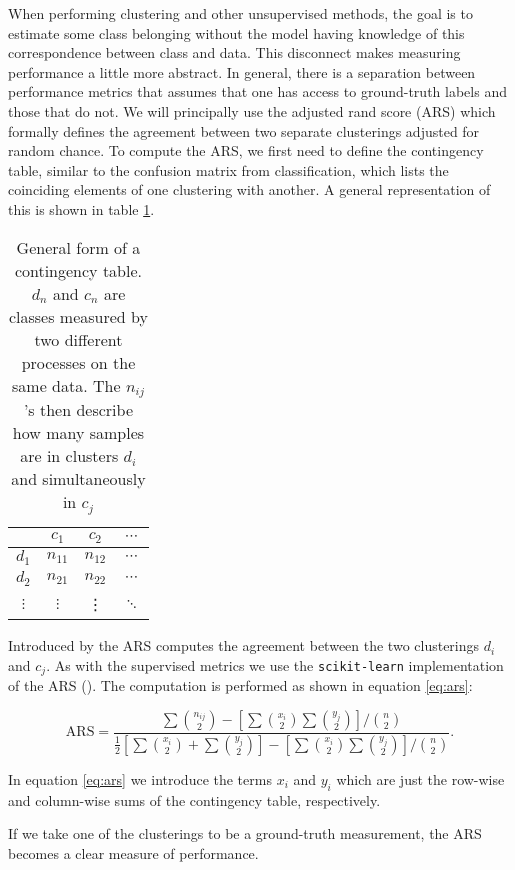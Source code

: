 When performing clustering and other unsupervised methods, the goal is to estimate some class belonging without the model having knowledge of this correspondence between class and data. This disconnect makes measuring performance a little more abstract. In general, there is a separation between performance metrics that assumes that one has access to ground-truth labels and those that do not. We will principally use the adjusted rand score (ARS) which formally defines the agreement between two separate clusterings adjusted for random chance. To compute the ARS, we first need to define the contingency table, similar to the confusion matrix from classification, which lists the coinciding elements of one clustering with another. A general representation of this is shown in table \ref{tab:contingency}. 

\begin{table}
\centering
\caption{General form of a contingency table. $d_n$ and $c_n$ are classes measured by two different processes on the same data. The $n_{ij}$'s then describe how many samples are in clusters $d_i$ and simultaneously in $c_j$}\label{tab:contingency}
\begin{tabular}{c|ccc}
& $c_1$ &$c_2$ & $\cdots$\\
\midrule
$d_1$ & $n_{11}$ & $n_{12}$ &  $\cdots$ \\
$d_2$ & $n_{21}$ & $n_{22}$ &  $\cdots$ \\
$\vdots$ & $\vdots$ & \vdots & $\ddots$ \\
\end{tabular}
\end{table}

Introduced by \cite{Hubert1985} the ARS computes the agreement between the two clusterings $d_i$ and $c_j$. As with the supervised metrics we use the \lstinline{scikit-learn} implementation of the ARS (\cite{Pedregosa2011}). The computation is performed as shown in equation \ref{eq:ars}:

\begin{equation}\label{eq:ars}
\text{ARS} = \frac{\sum  \binom{n_{ij}}{2} - \left[\sum  \binom{x_{i}}{2} \sum  \binom{y_{j}}{2}  \right]/\binom{n}{2}}{\frac{1}{2}\left[\sum  \binom{x_{i}}{2} + \sum  \binom{y_{j}}{2}  \right]- \left[\sum  \binom{x_{i}}{2} \sum  \binom{y_{j}}{2}  \right]/\binom{n}{2}}.
\end{equation}

\noindent In equation \ref{eq:ars} we introduce the terms $x_i$ and $y_i$ which are just the row-wise and column-wise sums of the contingency table, respectively.

If we take one of the clusterings to be a ground-truth measurement, the ARS becomes a clear measure of performance. 